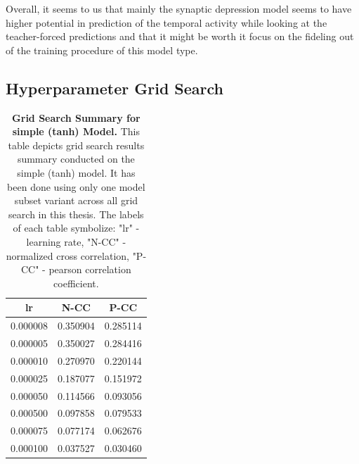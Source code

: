Overall, it seems to us that mainly the synaptic depression model seems to have higher potential in prediction of the temporal activity while looking at the teacher-forced predictions and that it might be worth it focus on the fideling out of the training procedure of this model type.

\subsection{Hyperparameter Grid Search}

\begin{table}
    \centering\footnotesize\sf
    \begin{tabular}{ccc}
    \toprule
    lr & N-CC & P-CC \\
    \midrule
    0.000008 & 0.350904 & 0.285114 \\
    0.000005 & 0.350027 & 0.284416 \\
    0.000010 & 0.270970 & 0.220144 \\
    0.000025 & 0.187077 & 0.151972 \\
    0.000050 & 0.114566 & 0.093056 \\
    0.000500 & 0.097858 & 0.079533 \\
    0.000075 & 0.077174 & 0.062676 \\
    0.000100 & 0.037527 & 0.030460 \\
    \bottomrule
    \end{tabular}
    \caption{\textbf{Grid Search Summary for simple (tanh) Model.} This table depicts grid search results summary conducted on the simple (tanh) model. It has been done using only one model subset variant across all grid search in this thesis. The labels of each table symbolize: "lr" - learning rate, "N-CC" - normalized cross correlation, "P-CC" - pearson correlation coefficient.}
    \label{tab:grid_simple_tanh}
\end{table}

